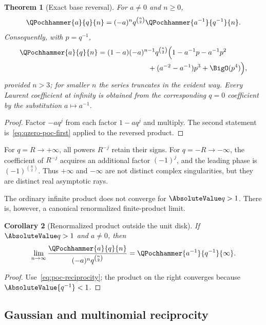 \documentclass[11pt,oneside]{article}
\newtheorem{theorem}{Theorem}[section]
\newtheorem{corollary}[theorem]{Corollary}
\theoremstyle{definition}
\theoremstyle{remark}
\let\reportsubsection\subsection
\let\section\reportsubsection
\begin{document}
\begin{theorem}[Exact base reversal]\label{thm:poc-infinity}
For $a\ne0$ and $n\ge0$,
\begin{equation}\label{eq:poc-reciprocity}
 \QPochhammer{a}{q}{n}=(-a)^nq^{\binom n2}\QPochhammer{a^{-1}}{q^{-1}}{n}.
\end{equation}
Consequently, with $p=q^{-1}$,
\begin{align}
 \QPochhammer{a}{q}{n}
 &=(1-a)(-a)^{n-1}q^{\binom n2}
 \Bigl(1-a^{-1}p-a^{-1}p^2
 \notag\\
 &\hspace{7em}+(a^{-2}-a^{-1})p^3+\BigO(p^4)\Bigr),
 \label{eq:poc-infinity-first}
\end{align}
provided $n>3$; for smaller $n$ the series truncates in the evident way.
Every Laurent coefficient at infinity is obtained from the corresponding
$q=0$ coefficient by the substitution $a\mapsto a^{-1}$.
\end{theorem}

\begin{proof}
Factor $-aq^j$ from each factor $1-aq^j$ and multiply.  The second statement
is~\eqref{eq:qzero-poc-first} applied to the reversed product.
\end{proof}

For $q=R\to+\infty$, all powers $R^{-j}$ retain their signs.  For
$q=-R\to-\infty$, the coefficient of $R^{-j}$ acquires an additional factor
$(-1)^j$, and the leading phase is $(-1)^{\binom n2}$.  Thus $+\infty$ and
$-\infty$ are not distinct complex singularities, but they are distinct real
asymptotic rays.

The ordinary infinite product does not converge for $\AbsoluteValue q>1$.  There is,
however, a canonical renormalized finite-product limit.

\begin{corollary}[Renormalized product outside the unit disk]
If $\AbsoluteValue q>1$ and $a\ne0$, then
\begin{equation}\label{eq:outside-renormalization}
 \lim_{n\to\infty}
 \frac{\QPochhammer{a}{q}{n}}{(-a)^nq^{\binom n2}}
 =\QPochhammer{a^{-1}}{q^{-1}}{\infty}.
\end{equation}
\end{corollary}

\begin{proof}
Use~\eqref{eq:poc-reciprocity}; the product on the right converges because
$\AbsoluteValue{q^{-1}}<1$.
\end{proof}

\section{Gaussian and multinomial reciprocity}
\end{document}
